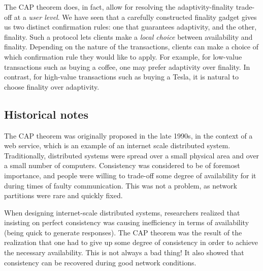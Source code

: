 \documentclass{article}
\begin{document}
The CAP theorem does, in fact, allow for resolving the adaptivity-finality trade-off at a {\em  user level}. We have seen that a carefully constructed finality gadget gives us two distinct confirmation rules: one that guarantees adaptivity, and  the other, finality. Such a protocol lets clients make a {\em local choice} between availability and finality. Depending on the nature of the transactions, clients can make a choice of which confirmation rule they would like to apply. For example, for low-value transactions such as buying a coffee, one may prefer adaptivity over finality. In contrast, for high-value transactions such as buying a Tesla, it is natural to choose finality over adaptivity.

\subsection*{Historical notes}
The CAP theorem was originally proposed in the late 1990s, in the context of a web service, which is an example of an internet scale distributed system. Traditionally, distributed systems were spread over a small physical area and over a small number of computers. Consistency was considered to be of foremost importance, and people were willing to trade-off some degree of availability for it during times of faulty communication. This was not a problem, as network partitions were rare and quickly fixed.

When designing internet-scale distributed systems, researchers realized that insisting on perfect consistency was causing inefficiency in terms of availability (being quick to generate responses). The CAP theorem was the result of the realization that one had to give up some degree of consistency in order to achieve the necessary availability. This is not always a bad thing! It also showed that consistency can be recovered during good network conditions.
\end{document}
